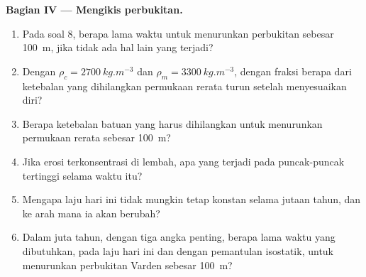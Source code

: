 \begin{problem}
\medskip
\noindent\textbf{Bagian IV --- Mengikis perbukitan.}
\begin{enumerate}[resume]
  \item Pada  soal 8, berapa lama waktu untuk menurunkan perbukitan
        sebesar \qty{100}{m}, jika tidak ada hal lain yang terjadi?
  \item Dengan $\rho_c = \qty{2700}{kg.m^{-3}}$ dan $\rho_m =
        \qty{3300}{kg.m^{-3}}$, dengan fraksi berapa dari ketebalan yang dihilangkan
        permukaan rerata turun setelah  menyesuaikan diri?
  \item Berapa ketebalan batuan yang harus dihilangkan untuk menurunkan permukaan rerata
        sebesar \qty{100}{m}?
  \item Jika erosi terkonsentrasi di lembah, apa yang terjadi pada puncak-puncak tertinggi selama waktu itu?
  \item Mengapa laju hari ini tidak mungkin tetap konstan selama jutaan tahun, dan ke arah mana ia akan berubah?
  \item Dalam juta tahun, dengan tiga angka penting, berapa lama waktu yang dibutuhkan, pada laju hari ini dan dengan pemantulan isostatik, untuk menurunkan perbukitan Varden sebesar \qty{100}{m}?
\end{enumerate}
\end{problem}
